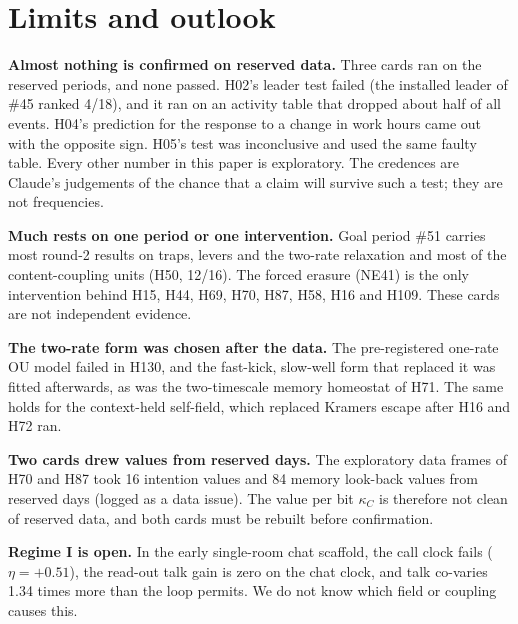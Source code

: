 \section{Limits and outlook}\label{sec:limits}

\textbf{Almost nothing is confirmed on reserved data.} Three cards ran on the reserved periods, and none passed. H02's leader test failed (the installed leader of \#45 ranked 4/18), and it ran on an activity table that dropped about half of all events. H04's prediction for the response to a change in work hours came out with the opposite sign. H05's test was inconclusive and used the same faulty table. Every other number in this paper is exploratory. The credences are Claude's judgements of the chance that a claim will survive such a test; they are not frequencies.

\textbf{Much rests on one period or one intervention.} Goal period \#51 carries most round-2 results on traps, levers and the two-rate relaxation  and most of the content-coupling units (H50, 12/16). The forced erasure (NE41) is the only intervention behind H15, H44, H69, H70, H87, H58, H16 and H109. These cards are not independent evidence.

\textbf{The two-rate form was chosen after the data.} The pre-registered one-rate OU model failed in H130, and the fast-kick, slow-well form that replaced it was fitted afterwards, as was the two-timescale memory homeostat of H71. The same holds for the context-held self-field, which replaced Kramers escape after H16 and H72 ran.

\textbf{Two cards drew values from reserved days.} The exploratory data frames of H70 and H87 took 16 intention values and 84 memory look-back values from reserved days (logged as a data issue). The value per bit $\kappa_C$ is therefore not clean of reserved data, and both cards must be rebuilt before confirmation.

\textbf{Regime I is open.} In the early single-room chat scaffold, the call clock fails ($\eta=+0.51$), the read-out talk gain is zero on the chat clock, and talk co-varies 1.34 times more than the loop permits. We do not know which field or coupling causes this.

